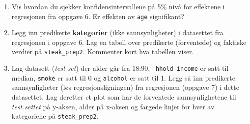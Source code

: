 \documentclass[12pt]{article}
\begin{document}
\begin{enumerate}
\item Vis hvordan du sjekker konfidensintervallene på 5\% nivå for effektene i
regresjonen fra oppgave 6. Er effekten av {\tt age} signifikant?

\item Legg inn predikerte \textbf{kategorier} (ikke sannsynligheter) i datasettet
fra regresjonen i oppgave 6. Lag en tabell over predikerte (forventede) og
faktiske verdier på {\tt steak{\_}prep2}. Kommenter kort hva tabellen viser.

\item Lag datasett (\emph{test set}) der alder går fra 18:90, {\tt
hhold{\_}income} er satt til median, {\tt smoke} er satt til 0 og {\tt alcohol}
er satt til 1. Legg så inn predikerte sannsynligheter (løs regresjonsligningen)
fra regresjonen (oppgave 7) i dette datasettet. Lag deretter et plot som har de
forventede sannsynlighetene til \emph{test settet} på y-aksen, alder på x-aksen
og fargede linjer for hver av kategoriene på {\tt steak{\_}prep2}.

\end{enumerate}
\end{document}
